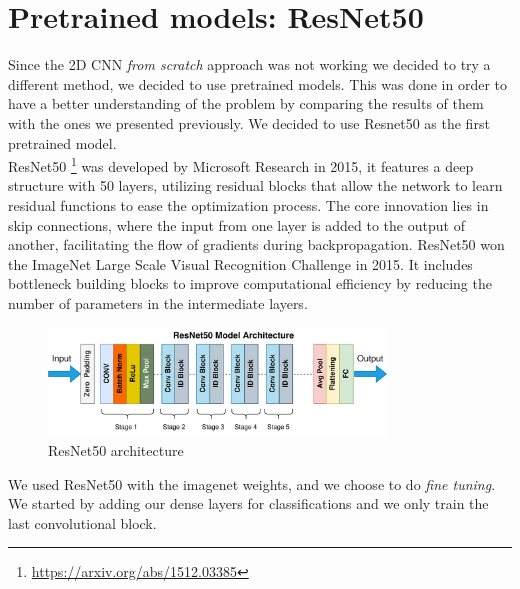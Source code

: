 \begin{table}[H]
    \centering
    \caption{2D models accuracy and recall}
    \label{tab:2DCNNTable}
\end{table}
\pagebreak
\section{Pretrained models: ResNet50}
Since the 2D CNN \textit{from scratch} approach was not working we decided to try a different method, we decided to use pretrained models. This was done in order to have a better understanding of the problem by comparing the results of them with the ones we presented previously. We decided to use Resnet50 as the first pretrained model. \\

ResNet50 \footnote{\url{https://arxiv.org/abs/1512.03385}} was developed by Microsoft Research in 2015, it features a deep structure with 50 layers, utilizing residual blocks that allow the network to learn residual functions to ease the optimization process.
The core innovation lies in skip connections, where the input from one layer is added to the output of another, facilitating the flow of gradients during backpropagation.
ResNet50  won the ImageNet Large Scale Visual Recognition Challenge in 2015. It includes bottleneck building blocks to improve computational efficiency by reducing the number of parameters in the intermediate layers.
\begin{figure}[]
    \centering
    \includegraphics[width=0.8\textwidth]{images/ResNet50_architecture.png}
    \caption{ResNet50 architecture}
    \label{fig:ResNet50Arch}
\end{figure}
We used ResNet50 with the imagenet weights, and we choose to do 
\textit{fine tuning}. We started by adding our dense layers for classifications and we only train the last convolutional block.  


